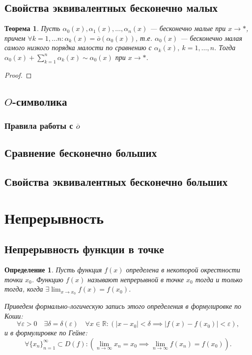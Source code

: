 \documentclass[a4paper,12pt]{article} %
\newtheorem{definition}{Определение}[section]
\newtheorem{theorem}{Теорема}[section]
\theoremstyle{remark}
\theoremstyle{definition}
\begin{document}
\subsection{Свойства эквивалентных бесконечно малых}
\begin{theorem}
	Пусть $\alpha_0(x), \alpha_1(x), \ldots, \alpha_n(x)$ --- бесконечно малые при $x\to *$, причем $\forall k = 1,
    \ldots n : \alpha_k(x) = \overline{o}(\alpha_0(x))$, т.е. $\alpha_0(x)$ --- 
    бесконечно малая самого низкого порядка малости по сравнению с $\alpha_k(x), \ k = 1, \ldots, n$.
    Тогда $\alpha_0(x) + \sum_{k=1}^{n} \alpha_k(x) \sim \alpha_0(x)$ при $x\to *$.
\end{theorem}
\begin{proof}
\end{proof}

\subsection{$O$-символика}

\subsubsection*{Правила работы с $\overline{o}$}

\subsection{Сравнение бесконечно больших}

\subsection{Свойства эквивалентных бесконечно больших}

\newpage
\section{Непрерывность}
\subsection{Непрерывность функции в точке}
\begin{definition}
	Пусть функция $f(x)$ определена в некоторой окрестности точки $x_0$. Функцию $f(x)$ называют непрерывной в точке $x_0$ тогда и только тогда, когда $\displaystyle \exists \lim_{x \to x_0} f(x) = f(x_0)$.

	Приведем формально-логическую запись этого определения в формулировке по Коши:
	\[
	\forall \varepsilon > 0 \quad \exists \delta=\delta(\varepsilon) \quad \forall  x \in  \mathbb{R} : (|x-x_0| < \delta \implies |f(x) - f(x_0)| < \varepsilon),
	\] 
	и в формулировке по Гейне:
	\[
	\forall \{x_n\}_{n=1}^{\infty} \subset D(f) : (\lim_{n \to \infty} x_n = x_0 \implies \lim_{n \to \infty} f(x_n) = f(x_0))
	.\] 
\end{definition}
\end{document}
